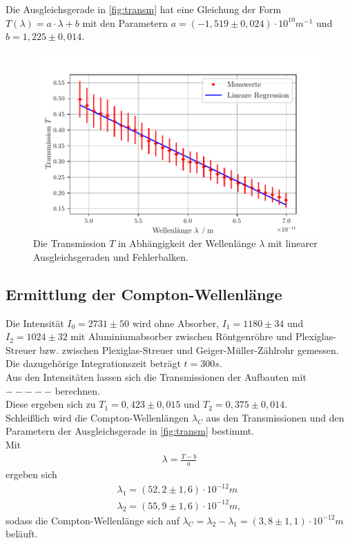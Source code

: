 Die Ausgleichsgerade in \autoref{fig:transm} hat eine Gleichung der Form $T(\lambda) = a \cdot \lambda + b$ mit 
den Parametern $a = (-1,519 \pm 0,024)\cdot 10^{10} m^{-1}$ und $b = 1,225 \pm 0,014$.

\begin{figure}
  \centering
  \includegraphics{build/transmission2.pdf}
  \caption{Die Transmission $T$ in Abhängigkeit der Wellenlänge $\lambda$ mit linearer Ausgleichsgeraden und Fehlerbalken.}
  \label{fig:transm2}
\end{figure}



\subsection{Ermittlung der Compton-Wellenlänge}
\label{subsec:comptonwellenl}

Die Intensität $I_0 = 2731 \pm 50$ wird ohne Absorber, $I_1 = 1180 \pm 34$ und $I_2 = 1024 \pm 32$ mit Aluminiumabsorber zwischen Röntgenröhre
und Plexiglas-Streuer bzw. zwischen Plexiglas-Streuer und Geiger-Müller-Zählrohr gemessen.\\
Die dazugehörige Integrationszeit beträgt $t = 300s$.\\

Aus den Intensitäten lassen sich die Transmissionen der Aufbauten mit $-----$ berechnen. \\
Diese ergeben sich zu $T_1 = 0,423 \pm 0,015$ und $T_2 = 0,375 \pm 0,014$.\\

Schleißlich wird die Compton-Wellenlängen $\lambda_C$ aus den Transmissionen und den Parametern der Ausgleichsgerade 
in \autoref{fig:transm} bestimmt. \\
Mit 
\begin{align*}
  \lambda = \frac{T-b}{a}
\end{align*}
ergeben sich
\begin{align*}
  \lambda_1 = (52,2 \pm 1,6) \cdot 10^{-12}m \\
  \lambda_2 = (55,9 \pm 1,6) \cdot 10^{-12}m,
\end{align*}
sodass die Compton-Wellenlänge sich auf $\lambda_C = \lambda_2 - \lambda_1 = (3,8 \pm 1,1) \cdot 10^{-12}m$ beläuft.\\